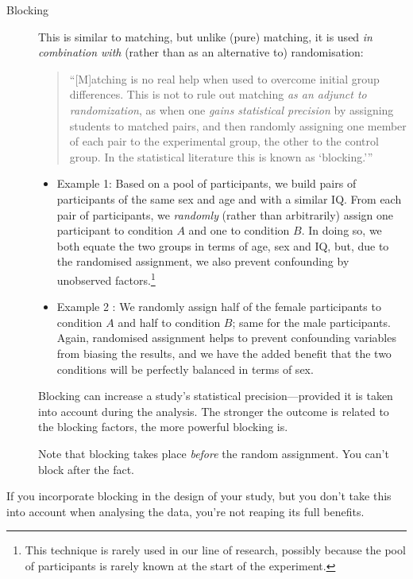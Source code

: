 \documentclass[a4paper]{tufte-book}\usepackage[]{graphicx}\usepackage[]{xcolor}
\begin{document}
\begin{description}
 \item[Blocking] This is similar to matching, 
 but unlike (pure) matching, it is used \emph{in combination with}
 (rather than as an alternative to) randomisation:
 \begin{quotation}
 ``[M]atching is no real help when used to
 overcome initial group differences.
  This is not to rule out matching \emph{as an adjunct to randomization}, as when one
  \emph{gains statistical precision} by assigning students to matched pairs, and
  then randomly assigning one member of each pair to the experimental group,
  the other to the control group. In the statistical literature this is known
  as `blocking.''' \citep[p.~15; my emphasis]{Campbell1963}
  \end{quotation}

  \begin{itemize}
 \item Example 1: Based on a pool of participants, we build pairs of participants of the same sex and age and
 with a similar IQ. From each pair of participants, we \emph{randomly}
 (rather than arbitrarily) assign one participant to condition $A$ and
 one to condition $B$. In doing so, we both equate the two groups
 in terms of age, sex and IQ, but, due to the randomised assignment,
 we also prevent confounding by
 unobserved factors.\footnote{This technique is rarely used in our line of research, possibly because the pool of participants is rarely known at the start of the experiment.}

 \item Example 2 \citep[see][]{Ludke2014}: We randomly assign half of the female participants to condition $A$ and half to condition $B$;
 same for the male participants. Again, randomised assignment helps to prevent
 confounding variables from biasing the results, and we have the added benefit that
 the two conditions will be perfectly balanced in terms of sex.
 \end{itemize}

 Blocking can increase a study's statistical precision---provided it is
 taken into account during the analysis.
 The stronger the outcome is related to the
 blocking factors, the more powerful blocking is.
 
 Note that blocking takes place \emph{before} the random assignment.
 You can't block after the fact.
\end{description}

If you incorporate blocking in the design of your study, 
but you don't take this into account when analysing the data,
you're not reaping its full benefits.
\end{document}

